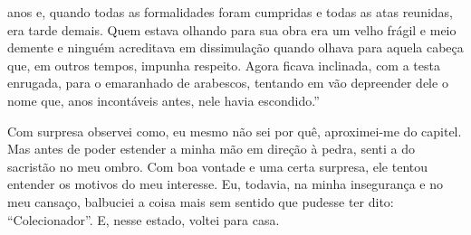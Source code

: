 anos e, quando todas as formalidades foram cumpridas e todas as atas
reunidas, era tarde demais. Quem estava olhando para sua obra era um
velho frágil e meio demente e ninguém acreditava em dissimulação quando
olhava para aquela cabeça que, em outros tempos, impunha respeito. Agora
ficava inclinada, com a testa enrugada, para o emaranhado de arabescos,
tentando em vão depreender dele o nome que, anos incontáveis antes, nele
havia escondido.''

Com surpresa observei como, eu mesmo não sei por quê, aproximei-me do
capitel. Mas antes de poder estender a minha mão em direção à pedra,
senti a do sacristão no meu ombro. Com boa vontade e uma certa surpresa,
ele tentou entender os motivos do meu interesse. Eu, todavia, na minha
insegurança e no meu cansaço, balbuciei a coisa mais sem sentido que
pudesse ter dito: ``Colecionador''. E, nesse estado, voltei para casa.

